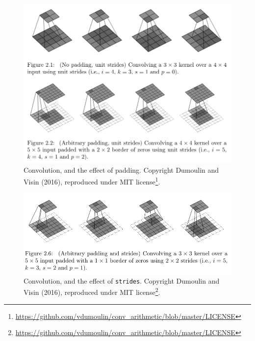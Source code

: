 \documentclass[
  letterpaper,
]{krantz}
\DeclareRobustCommand{\href}[2]{#2\footnote{\url{#1}}}
\begin{document}
\begin{figure}[H]

{\centering \includegraphics{images/images-conv-arithmetic-padding.png}

}

\caption{\label{fig-images-conv-arithmetic-padding}Convolution, and the
effect of padding. Copyright Dumoulin and Visin (2016), reproduced under
\href{https://github.com/vdumoulin/conv_arithmetic/blob/master/LICENSE}{MIT
license}.}

\end{figure}

\begin{figure}[H]

{\centering \includegraphics{images/images-conv-arithmetic-strides.png}

}

\caption{\label{fig-images-conv-arithmetic-strides}Convolution, and the
effect of \texttt{strides}. Copyright Dumoulin and Visin (2016),
reproduced under
\href{https://github.com/vdumoulin/conv_arithmetic/blob/master/LICENSE}{MIT
license}.}

\end{figure}
\end{document}
